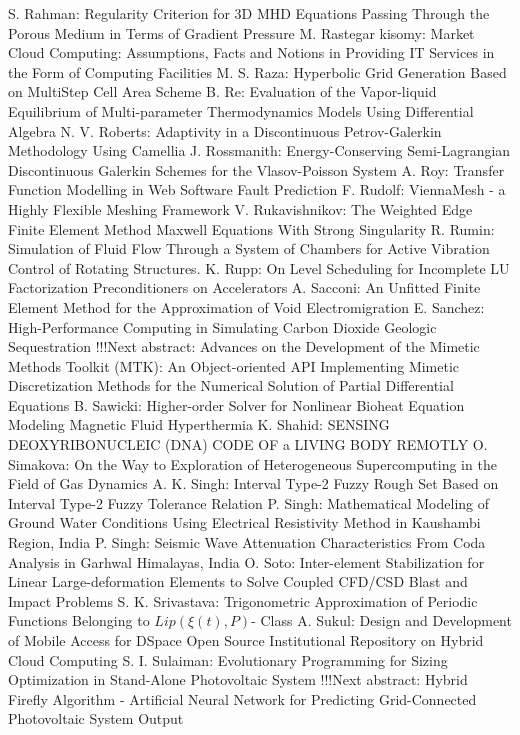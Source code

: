 \documentclass[10pt, A4]{article}%
\begin{document}
{S. Rahman}: {Regularity Criterion for 3D MHD Equations Passing Through the Porous Medium in Terms of Gradient Pressure}
{M. Rastegar kisomy}: {Market Cloud Computing: Assumptions, Facts and Notions in Providing IT Services in the Form of Computing Facilities}
{M. S. Raza}: {Hyperbolic Grid Generation Based on MultiStep Cell Area Scheme}
{B. Re}: {Evaluation of the Vapor-liquid Equilibrium of Multi-parameter Thermodynamics Models Using Differential Algebra}
{N. V. Roberts}: {Adaptivity in a Discontinuous Petrov-Galerkin Methodology Using Camellia}
{J. Rossmanith}: {Energy-Conserving Semi-Lagrangian Discontinuous Galerkin Schemes for the Vlasov-Poisson System}
{A. Roy}: {Transfer Function Modelling in Web Software Fault Prediction}
{F. Rudolf}: {ViennaMesh - a Highly Flexible Meshing Framework}
{V. Rukavishnikov}: {The Weighted Edge Finite Element Method Maxwell Equations With Strong Singularity}
{R. Rumin}: {Simulation of Fluid Flow Through a System of Chambers for Active Vibration Control of Rotating Structures.}
{K. Rupp}: {On Level Scheduling for Incomplete LU Factorization Preconditioners on Accelerators}
{A. Sacconi}: {An Unfitted Finite Element Method for the Approximation of Void Electromigration}
{E. Sanchez}: {High-Performance Computing in Simulating Carbon Dioxide Geologic Sequestration       !!!Next abstract: Advances on the Development of the Mimetic Methods Toolkit (MTK): An Object-oriented API Implementing Mimetic Discretization Methods for the Numerical Solution of Partial Differential Equations}
{B. Sawicki}: {Higher-order Solver for Nonlinear Bioheat Equation Modeling Magnetic Fluid Hyperthermia}
{K. Shahid}: {SENSING DEOXYRIBONUCLEIC (DNA) CODE OF a LIVING BODY REMOTLY}
{O. Simakova}: {On the Way to Exploration of Heterogeneous Supercomputing in the Field of Gas Dynamics}
{A. K. Singh}: {Interval Type-2 Fuzzy Rough Set Based on Interval Type-2 Fuzzy Tolerance Relation}
{P. Singh}: {Mathematical Modeling of Ground Water Conditions Using Electrical Resistivity Method in Kaushambi Region, India}
{P. Singh}: {Seismic Wave Attenuation Characteristics  From Coda Analysis in Garhwal Himalayas, India}
{O. Soto}: {Inter-element Stabilization for Linear Large-deformation Elements to Solve Coupled CFD/CSD Blast and Impact Problems}
{S. K. Srivastava}: {Trigonometric Approximation of Periodic Functions Belonging to $Lip(\xi(t), P)$- Class}
{A. Sukul}: {Design and Development of Mobile Access for DSpace Open Source Institutional Repository on Hybrid Cloud Computing}
{S. I. Sulaiman}: {Evolutionary Programming for Sizing Optimization in Stand-Alone Photovoltaic System       !!!Next abstract: Hybrid Firefly Algorithm - Artificial Neural Network for Predicting Grid-Connected Photovoltaic System Output}
\end{document}

